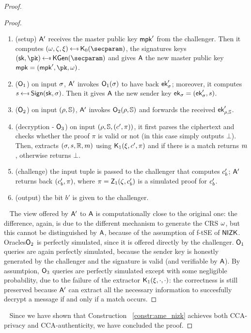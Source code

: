 \begin{theorem}
\begin{proof}
\begin{lemma}
\begin{proof}
                \begin{enumerate}
                    \item (setup) $\mathsf{A}'$ receives the master public key $\mathsf{mpk}'$ from the challenger. Then it computes $(\crs,\tpsim,\tpext)\getsr\nizkext_0(\secparam)$, the signatures keys $(\sk, \pk) \getsr \kgen(\secparam)$ and gives $\mathsf{A}$ the new master public key $\mpk = (\mpk', \pk, \crs)$.
                    \item ($\mathsf{O}_1$) on input $\sigma$, $\mathsf{A}'$ invokes $\mathsf{O}_1(\sigma)$ to have back $\mathsf{ek}'_\sigma$; moreover, it computes $\signature \getsr \sign(\sk, \sattr)$. Then it gives $\mathsf{A}$ the new sender key $\mathsf{ek}_\sigma = (\mathsf{ek}'_\sigma, s)$.
                    \item ($\mathsf{O}_2$) on input $(\rho, \mathbb{S})$, $\mathsf{A}'$ invokes $\mathsf{O}_2(\rho, \mathbb{S})$ and forwards the received $\mathsf{ek}'_{\rho, \mathbb{S}}$.
                    \item (decryption - $\mathsf{O}_3$) on input $(\rho, \mathbb{S}, (c', \pi))$, it first parses the ciphertext and checks whether the proof $\pi$ is valid or not (in this case simply outputs $\bot$). Then, extracts $(\sigma, s, \mathbb{R}, m)$ using $\mathsf{K}_1(\xi,c',\pi)$ and if there is a match returns $m$, otherwise returns $\bot$.
                    \item (challenge) the input tuple is passed to the challenger that computes $c'_b$; $\mathsf{A}'$ returns back $(c'_b, \pi)$, where $\pi = \mathsf{Z}_1(\zeta, c'_b)$ is a simulated proof for $c'_b$.
                    \item (output) the bit $b'$ is given to the challenger.
                \end{enumerate}
                ~\newline
                The view offered by $\mathsf{A}'$ to $\mathsf{A}$ is computationally close to the original one: the difference, again, is due to the different mechanism to generate the CRS $\omega$, but this cannot be distinguished by $\mathsf{A}$, because of the assumption of f-tSE of $\mathsf{NIZK}$.
                Oracles$\mathsf{O}_2$ is perfectly simulated, since it is offered directly by the challenger.
                $\mathsf{O}_1$ queries are again perfectly simulated, because the sender key is honestly generated by the challenger and the signature is valid (and verifiable by $\mathsf{A}$).
                By assumtpion, $\mathsf{O}_3$ queries are perfectly simulated except with some negligible probability, due to the failure of the extractor $\mathsf{K}_1(\xi, \cdot, \cdot)$: the correctness is still preserved because $\mathsf{A}'$ can extract all the necessary information to succesfully decrypt a message if and only if a match occurs.
            \end{proof}
        \end{lemma}
        ~\newline
        Since we have shown that Construction ~\ref{constr:ame_nizk} achieves both CCA-privacy and CCA-authenticity, we have concluded the proof.
    \end{proof}
\end{theorem}